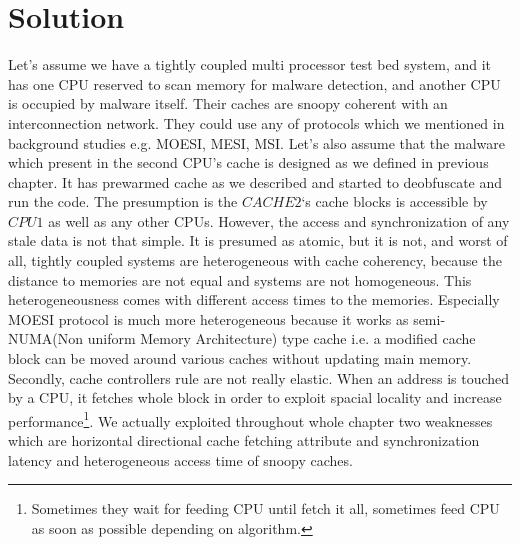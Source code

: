 \section{Solution}
	Let's assume we have a tightly coupled multi processor test bed system, and it has one CPU reserved to scan memory for malware detection, and another CPU is occupied by malware itself. Their caches are snoopy coherent with an interconnection network.  They could use any of protocols which we mentioned in background studies e.g. MOESI, MESI, MSI. Let's also assume that the malware which present in the second CPU's cache is designed as we defined in previous chapter. It has prewarmed cache as we described and started to deobfuscate and run the code. The presumption is the $CACHE 2$`s cache blocks is accessible by $CPU1$ as well as any other CPUs. However, the access and synchronization of any stale data is not that simple. It is presumed as atomic, but it is not, and worst of all, tightly coupled systems are heterogeneous with cache coherency, because the distance to memories are not equal and systems are not homogeneous. This heterogeneousness comes with different access times to the memories. Especially MOESI protocol is much more heterogeneous because it works as semi-NUMA(Non uniform Memory Architecture) type cache i.e. a modified cache block can be moved around various caches without updating main memory. Secondly, cache controllers rule are not really elastic. When an address is touched by a CPU, it fetches whole block in order to exploit spacial locality and increase performance\footnote{Sometimes they wait for feeding CPU until fetch it all, sometimes feed CPU as soon as possible depending on algorithm.}. We actually exploited throughout whole chapter two weaknesses which are horizontal directional cache fetching attribute and synchronization latency and heterogeneous access time of snoopy caches.
